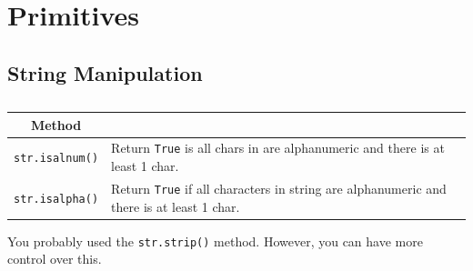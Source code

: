 \section{Primitives}  

  \subsection{String Manipulation} 

    \begin{definition}
      \label{def:checking-alphanumeric}
      \begin{table}[H]
        \centering
        \begin{tabular}{|c|p{8cm}|}
          \hline
          \textbf{Method} & \textbf{} \\
          \hline
          \texttt{str.isalnum()} & Return \texttt{True} is all chars in are alphanumeric and there is at least 1 char.\\ 
          \texttt{str.isalpha()} & Return \texttt{True} if all characters in string are alphanumeric and there is at least 1 char. \\ 
          \hline 
        \end{tabular}
        \caption{}
      \end{table}
    \end{definition}

    You probably used the \texttt{str.strip()} method. However, you can have more control over this. 

